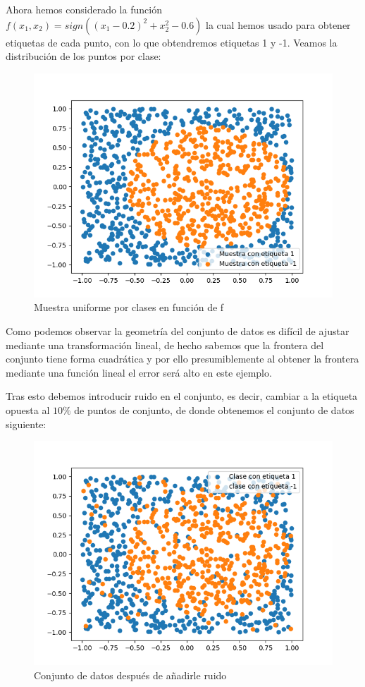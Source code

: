 \documentclass[12pt,a4paper]{article}
\begin{document}
Ahora hemos considerado la función $f(x_1,x_2) = sign((x_1-0.2)^2 + x_{2}^{2}-0.6)$ la cual hemos usado para obtener etiquetas de cada punto, con lo que obtendremos etiquetas 1 y -1. Veamos la distribución de los puntos por clase:

\begin{figure}[H]
	\centering
	\includegraphics[scale=0.8]{./Imagenes/ej2-2-3.png}
	\caption{Muestra uniforme por clases en función de f}
	\label{ej2-2-3}
\end{figure}

Como podemos observar la geometría del conjunto de datos es difícil de ajustar mediante una transformación lineal, de hecho sabemos que la frontera del conjunto tiene forma cuadrática y por ello presumiblemente al obtener la frontera mediante una función lineal el error será alto en este ejemplo.

Tras esto debemos introducir ruido en el conjunto, es decir, cambiar a la etiqueta opuesta al $10\%$ de puntos de conjunto, de donde obtenemos el conjunto de datos siguiente:

\begin{figure}[H]
	\centering
	\includegraphics[scale=0.8]{./Imagenes/ej2-2-2.png}
	\caption{Conjunto de datos después de añadirle ruido}
	\label{ej2-2-2}
\end{figure}
\end{document}
